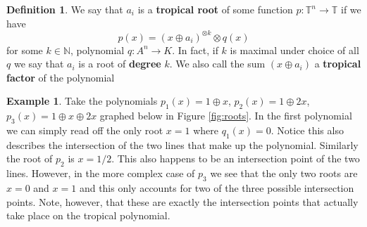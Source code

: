 \documentclass[12pt,a4paper]{amsart}
\newcommand{\N}{\mathbb{N}}
\newcommand{\T}{\mathbb{T}}
\theoremstyle{definition}
\newtheorem{defn}{Definition}[section]
\newtheorem{ex}{Example}[section]
\theoremstyle{remark}
\begin{document}
\begin{defn}
We say that $a_i$ is a \textbf{tropical root} of some function $p:\T^n\to \T$ if we have
\begin{equation}
    p(x) = (x \oplus a_i)^{\otimes k}\otimes q(x)
\end{equation}
for some $k\in\N$, polynomial $q:A^n\to K$. In fact, if $k$ is maximal under choice of all $q$ we say that $a_i$ is a root of \textbf{degree} $k$. We also call the sum $(x \oplus a_i)$ a \textbf{tropical factor} of the polynomial
\end{defn}

\begin{ex}\label{ex:roots}
Take the polynomials $p_1(x) = 1 \oplus x$, $p_2(x)=1\oplus 2x$, $p_3(x)=1\oplus x\oplus 2x$ graphed below in Figure \ref{fig:roots}. In the first polynomial we can simply read off the only root $x=1$ where $q_1(x) = 0$. Notice this also describes the intersection of the two lines that make up the polynomial. Similarly the root of $p_2$ is $x=1/2$. This also happens to be an intersection point of the two lines. However, in the more complex case of $p_3$ we see that the only two roots are $x=0$ and $x=1$ and this only accounts for two of the three possible intersection points. Note, however, that these are exactly the intersection points that actually take place on the tropical polynomial.
\end{ex}
\end{document}
